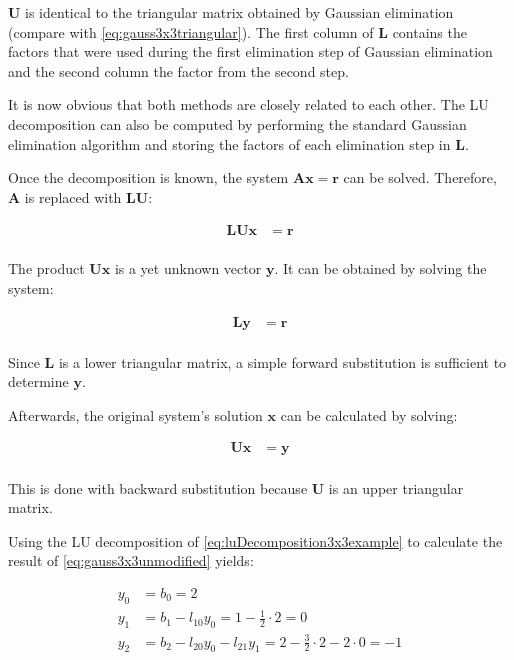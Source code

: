 $\mathbf{U}$ is identical to the triangular matrix obtained by Gaussian elimination (compare with \cref{eq:gauss3x3triangular}).
The first column of $\mathbf{L}$ contains the factors that were used during the first elimination step of Gaussian elimination and the second column the factor from the second step.

It is now obvious that both methods are closely related to each other. 
The LU decomposition can also be computed by performing the standard Gaussian elimination algorithm and storing the factors of each elimination step in $\mathbf{L}$.

Once the decomposition is known, the system $\mathbf{A}\mathbf{x} = \mathbf{r}$ can be solved.
Therefore, $\mathbf{A}$ is replaced with $\mathbf{LU}$:

\begin{align*}
\mathbf{LU}\mathbf{x} &= \mathbf{r}\\
\end{align*}

The product $\mathbf{Ux}$ is a yet unknown vector $\mathbf{y}$. 
It can be obtained by solving the system:

\begin{align*}
\mathbf{L}\mathbf{y} &= \mathbf{r}\\
\end{align*}

Since $\mathbf{L}$ is a lower triangular matrix, a simple forward substitution is sufficient to determine $\mathbf{y}$.

Afterwards, the original system's solution $\mathbf{x}$ can be calculated by solving:

\begin{align*}
\mathbf{U}\mathbf{x} &= \mathbf{y}\\
\end{align*}

This is done with backward substitution because $\mathbf{U}$ is an upper triangular matrix.

Using the LU decomposition of \cref{eq:luDecomposition3x3example} to calculate the result of \cref{eq:gauss3x3unmodified} yields:

\begin{align*}
y_0 &= b_0 = 2\\
y_1 &= b_1 - l_{10}y_0 = 1 - \frac{1}{2} \cdot 2 = 0\\
y_2 &= b_2 - l_{20}y_0 - l_{21}y_1 = 2 - \frac{3}{2} \cdot 2 - 2 \cdot 0 = -1
\end{align*}

